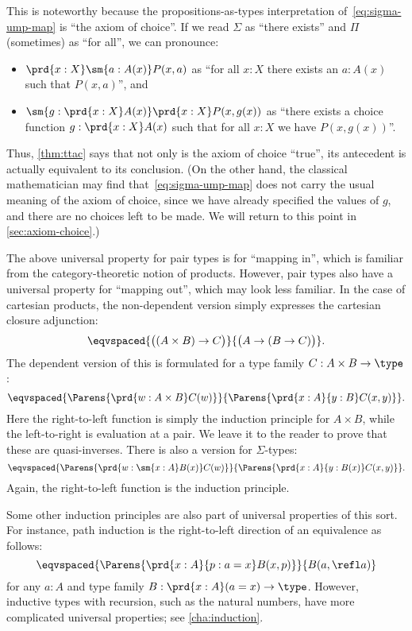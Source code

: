 This is noteworthy because the propositions-as-types interpretation of~\eqref{eq:sigma-ump-map} is ``the axiom of choice''.
If we read $\Sigma$ as ``there exists'' and $\Pi$ (sometimes) as ``for all'', we can pronounce:
\begin{itemize}
\item $\prd{x:X} \sm{a:A(x)} P(x,a)$ as ``for all $x:X$ there exists an $a:A(x)$ such that $P(x,a)$'', and
\item $\sm{g:\prd{x:X} A(x)} \prd{x:X} P(x,g(x))$ as ``there exists a choice function $g:\prd{x:X} A(x)$ such that for all $x:X$ we have $P(x,g(x))$''.
\end{itemize}
Thus, \cref{thm:ttac} says that not only is the axiom of choice ``true'', its antecedent is actually equivalent to its conclusion.
(On the other hand, the classical mathematician may find that~\eqref{eq:sigma-ump-map} does not carry the usual meaning of the axiom of choice, since we have already specified the values of $g$, and there are no choices left to be made.
We will return to this point in \cref{sec:axiom-choice}.)

The above universal property for pair types is for ``mapping in'', which is familiar from the category-theoretic notion of products.
However, pair types also have a universal property for ``mapping out'', which may look less familiar.
In the case of cartesian products, the non-dependent version simply expresses
the cartesian closure adjunction:
\[ \eqvspaced{\big((A\times B) \to C\big)}{\big(A\to (B\to C)\big)}.\]
The dependent version of this is formulated for a type family $C:A\times B\to \type$:
\[ \eqvspaced{\Parens{\prd{w:A\times B} C(w)}}{\Parens{\prd{x:A}{y:B} C(x,y)}}. \]
Here the right-to-left function is simply the induction principle for $A\times B$, while the left-to-right is evaluation at a pair.
We leave it to the reader to prove that these are quasi-inverses.
There is also a version for $\Sigma$-types:
\begin{equation}
  \eqvspaced{\Parens{\prd{w:\sm{x:A} B(x)} C(w)}}{\Parens{\prd{x:A}{y:B(x)} C(x,y)}}.\label{eq:sigma-lump}
\end{equation}
Again, the right-to-left function is the induction principle.

Some other induction principles are also part of universal properties of this sort.
For instance, path induction is the right-to-left direction of an equivalence as follows:
%
%
\begin{equation}
  \label{eq:path-lump}
  \eqvspaced{\Parens{\prd{x:A}{p:a=x} B(x,p)}}{B(a,\refl a)}
\end{equation}
for any $a:A$ and type family $B:\prd{x:A} (a=x) \to\type$.
However, inductive types with recursion, such as the natural numbers, have more complicated universal properties; see \cref{cha:induction}.

